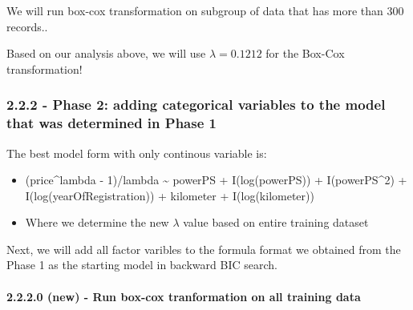 \documentclass[]{article}
\newenvironment{Shaded}{\begin{snugshade}}{\end{snugshade}}
\newcommand{\DataTypeTok}[1]{\textcolor[rgb]{0.13,0.29,0.53}{#1}}
\newcommand{\DecValTok}[1]{\textcolor[rgb]{0.00,0.00,0.81}{#1}}
\newcommand{\KeywordTok}[1]{\textcolor[rgb]{0.13,0.29,0.53}{\textbf{#1}}}
\newcommand{\NormalTok}[1]{#1}
\newcommand{\OperatorTok}[1]{\textcolor[rgb]{0.81,0.36,0.00}{\textbf{#1}}}
\newcommand{\StringTok}[1]{\textcolor[rgb]{0.31,0.60,0.02}{#1}}
\providecommand{\tightlist}{%
  \setlength{\itemsep}{0pt}\setlength{\parskip}{0pt}}
\let\oldparagraph\paragraph
\renewcommand{\paragraph}[1]{\oldparagraph{#1}\mbox{}}
\begin{document}
We will run box-cox transformation on subgroup of data that has more
than 300 records..

\begin{Shaded}
\end{Shaded}

Based on our analysis above, we will use \(\lambda=0.1212\) for the
Box-Cox transformation!

\hypertarget{phase-2-adding-categorical-variables-to-the-model-that-was-determined-in-phase-1}{%
\subsubsection{2.2.2 - Phase 2: adding categorical variables to the
model that was determined in Phase
1}\label{phase-2-adding-categorical-variables-to-the-model-that-was-determined-in-phase-1}}

The best model form with only continous variable is:

\begin{itemize}
\tightlist
\item
  (price\^{}lambda - 1)/lambda \textasciitilde{} powerPS +
  I(log(powerPS)) + I(powerPS\^{}2) + I(log(yearOfRegistration)) +
  kilometer + I(log(kilometer))\\
\item
  Where we determine the new \(\lambda\) value based on entire training
  dataset
\end{itemize}

Next, we will add all factor varibles to the formula format we obtained
from the Phase 1 as the starting model in backward BIC search.

\hypertarget{new---run-box-cox-tranformation-on-all-training-data}{%
\paragraph{2.2.2.0 (new) - Run box-cox tranformation on all training
data}\label{new---run-box-cox-tranformation-on-all-training-data}}
\end{document}
